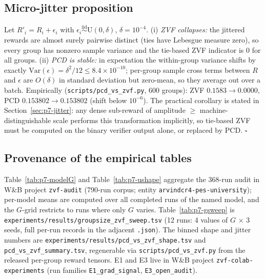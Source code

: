 \documentclass{article}
\providecommand{\eps}{\ensuremath{\epsilon}}
\begin{document}
\subsection{Micro-jitter proposition}
\label{sec:p7-appendix-jitter}
Let $R'_i = R_i + \eps_i$ with $\eps_i \stackrel{\text{iid}}{\sim}
\mathrm{U}(0, \delta)$, $\delta = 10^{-4}$. (i) \emph{ZVF collapses:} the
jittered rewards are almost surely pairwise distinct (ties have Lebesgue
measure zero), so every group has nonzero sample variance and the tie-based
ZVF indicator is $0$ for all groups. (ii) \emph{PCD is stable:} in
expectation the within-group variance shifts by exactly
$\mathrm{Var}(\eps) = \delta^2/12 \leq 8.4 \times 10^{-10}$; per-group
sample cross terms between $R$ and $\eps$ are $O(\delta)$ in standard
deviation but zero-mean, so they average out over a batch. Empirically
(\texttt{scripts/pcd\_vs\_zvf.py}, $600$ groups): ZVF $0.1583 \to 0.0000$,
PCD $0.153802 \to 0.153802$ (shift below $10^{-6}$). The practical
corollary is stated in Section~\ref{sec:p7-jitter}: any dense sub-reward of
amplitude $\geq$ machine-distinguishable scale performs this transformation
implicitly, so tie-based ZVF must be computed on the binary verifier output
alone, or replaced by PCD. \hfill$\square$

\subsection{Provenance of the empirical tables}
\label{sec:p7-appendix-provenance}
Table~\ref{tab:p7-modelG} and Table~\ref{tab:p7-ushape} aggregate the
368-run audit in W\&B project \texttt{zvf-audit} (790-run corpus; entity
\texttt{arvindcr4-pes-university}); per-model means are computed over all
completed runs of the named model, and the $G$-grid restricts to runs where
only $G$ varies. Table~\ref{tab:p7-gsweep} is
\texttt{experiments/results/groupsize\_zvf\_sweep.tsv} (12 runs: 4 values
of $G$ $\times$ 3 seeds, full per-run records in the adjacent
\texttt{.json}). The binned
shape and jitter numbers are
\texttt{experiments/results/pcd\_vs\_zvf\_shape.tsv} and
\texttt{pcd\_vs\_zvf\_summary.tsv}, regenerable via
\texttt{scripts/pcd\_vs\_zvf.py} from the released per-group reward
tensors. E1 and E3 live in W\&B project \texttt{zvf-colab-experiments}
(run families \texttt{E1\_grad\_signal}, \texttt{E3\_open\_audit}).
 

\end{document}

